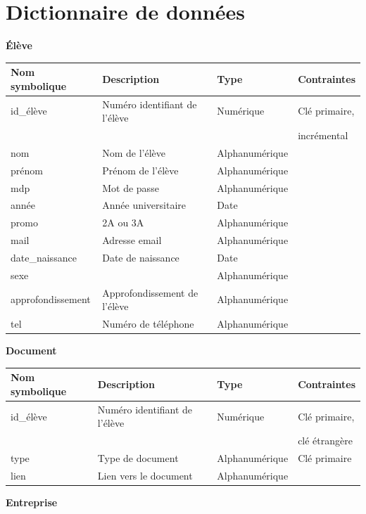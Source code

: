 \documentclass{scrreprt}
\begin{document}
\section*{Dictionnaire de données}

\begin{flushleft}
\textbf{\'El\`eve}
\end{flushleft}

\begin{tabular}{|l|l|l|l|}
\hline
\textbf{Nom symbolique} & \textbf{Description} & \textbf{Type} & \textbf{Contraintes} \\
\hline
id\_élève & Numéro identifiant de l’élève & Numérique & Clé primaire,\\
&&& incrémental \\
nom & Nom de l'élève & Alphanumérique & \\
prénom & Prénom de l'élève & Alphanumérique & \\
mdp & Mot de passe & Alphanumérique & \\
année & Année universitaire & Date & \\
promo & 2A ou 3A & Alphanumérique & \\
mail & Adresse email & Alphanumérique & \\
date\_naissance & Date de naissance & Date & \\
sexe & & Alphanumérique & \\
approfondissement & Approfondissement de l'élève & Alphanumérique & \\
tel & Numéro de téléphone & Alphanumérique & \\
\hline
\end{tabular}

\begin{flushleft}
\textbf{Document}
\end{flushleft}

\begin{tabular}{|l|l|l|l|}
\hline
\textbf{Nom symbolique} & \textbf{Description} & \textbf{Type} & \textbf{Contraintes} \\
\hline
id\_élève & Numéro identifiant de l’élève & Numérique & Clé primaire,\\
&&& clé étrangère \\
type & Type de document & Alphanumérique & Clé primaire \\
lien & Lien vers le document & Alphanumérique & \\
\hline
\end{tabular}

\newpage
\begin{flushleft}
\textbf{Entreprise}
\end{flushleft}
\end{document}
